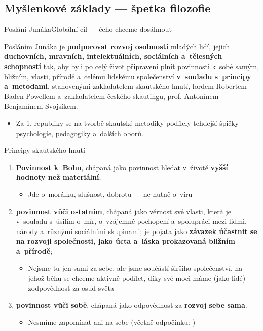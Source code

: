 \documentclass[compress, ucs, xelatex, xcolor=dvipsnames, print,
  hyperref={
    bookmarks=true,
    unicode=true,
    colorlinks=true,
    plainpages=false,
    pdfkeywords={Skaut, Junak, Skauting, Vychovna metoda},
    linkcolor=Black,
    anchorcolor=Black,
    citecolor=OliveGreen,
    filecolor=OliveGreen,
    menucolor=Black,
    urlcolor=OliveGreen,
    pdftex}
  ]{beamer}
\begin{document}
\subsection{Myšlenkové základy --- špetka filozofie}

\begin{frame}{Poslání Junáka}{Globální cíl --- čeho chceme dosáhnout}
  \begin{center}
    \begin{Large}
      Posláním Junáka je \textbf{podporovat rozvoj osobnosti} mladých lidí, jejich \textbf{duchovních, mravních, intelektuálních, sociálních a~tělesných schopností} tak, aby byli po celý život připraveni plnit povinnosti k~sobě samým, bližním, vlasti, přírodě a~celému lidskému společenství \textbf{v~souladu s~principy a~metodami}, stanovenými zakladatelem skautského hnutí, lordem Robertem Baden-Powellem a~zakladatelem českého skautingu, prof. Antonínem Benjamínem Svojsíkem.
    \end{Large}
  \end{center}
  \begin{itemize}
    \item Za 1. republiky se na tvorbě skautské metodiky podílely tehdejší špičky psychologie, pedagogiky a~dalších oborů.
  \end{itemize}
\end{frame}

\begin{frame}{Principy skautského hnutí}
  \begin{enumerate}
    \item \textbf{Povinnost k~Bohu}, chápaná jako povinnost hledat v~životě \textbf{vyšší hodnoty než materiální};
    \begin{itemize}
      \item Jde o~morálku, slušnost, dobrotu --- ne nutně o~víru
    \end{itemize}
    \item \textbf{povinnost vůči ostatním}, chápaná jako věrnost své vlasti, která je v~souladu s~úsilím o~mír, o~vzájemné pochopení a~spolupráci mezi lidmi, národy a~různými sociálními skupinami; je pojata jako \textbf{závazek účastnit se na rozvoji společnosti, jako úcta a~láska prokazovaná bližním a~přírodě};
    \begin{itemize}
      \item Nejsme tu jen sami za sebe, ale jsme součástí širšího společenství, na jehož běhu se chceme aktivně podílet, díky své moci máme (jako lidé) zodpovědnost za osud světa
    \end{itemize}
    \item \textbf{povinnost vůči sobě}, chápaná jako odpovědnost za \textbf{rozvoj sebe sama}.
    \begin{itemize}
      \item Nesmíme zapomínat ani na sebe (včetně odpočinku:-)
    \end{itemize}
  \end{enumerate}
\end{frame}
\end{document}
